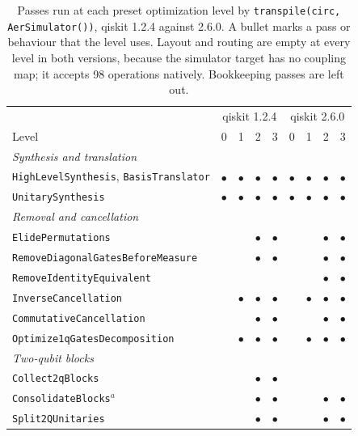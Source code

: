 \begin{table}[htbp]
\centering
\caption{Passes run at each preset optimization level by
\texttt{transpile(circ, AerSimulator())}, qiskit 1.2.4 against 2.6.0. A
bullet marks a pass or behaviour that the level uses. Layout and routing are
empty at every level in both versions, because the simulator target has no
coupling map; it accepts 98 operations natively. Bookkeeping passes are left
out.}
\label{tab:qiskit-optlevel-passes}
\footnotesize
\begin{tabular}{l|cccc|cccc}
\hline
 & \multicolumn{4}{c|}{qiskit 1.2.4} & \multicolumn{4}{c}{qiskit 2.6.0} \\
Level & 0 & 1 & 2 & 3 & 0 & 1 & 2 & 3 \\
\hline
\multicolumn{9}{l}{\textit{Synthesis and translation}} \\
\texttt{HighLevelSynthesis}, \texttt{BasisTranslator}
  & $\bullet$ & $\bullet$ & $\bullet$ & $\bullet$
  & $\bullet$ & $\bullet$ & $\bullet$ & $\bullet$ \\
\texttt{UnitarySynthesis}
  & $\bullet$ & $\bullet$ & $\bullet$ & $\bullet$
  & $\bullet$ & $\bullet$ & $\bullet$ & $\bullet$ \\
\hline
\multicolumn{9}{l}{\textit{Removal and cancellation}} \\
\texttt{ElidePermutations}
  & & & $\bullet$ & $\bullet$ & & & $\bullet$ & $\bullet$ \\
\texttt{RemoveDiagonalGatesBeforeMeasure}
  & & & $\bullet$ & $\bullet$ & & & $\bullet$ & $\bullet$ \\
\texttt{RemoveIdentityEquivalent}
  & & & & & & & $\bullet$ & $\bullet$ \\
\texttt{InverseCancellation}
  & & $\bullet$ & $\bullet$ & $\bullet$ & & $\bullet$ & $\bullet$ & $\bullet$ \\
\texttt{CommutativeCancellation}
  & & & $\bullet$ & $\bullet$ & & & $\bullet$ & $\bullet$ \\
\texttt{Optimize1qGatesDecomposition}
  & & $\bullet$ & $\bullet$ & $\bullet$ & & $\bullet$ & $\bullet$ & $\bullet$ \\
\hline
\multicolumn{9}{l}{\textit{Two-qubit blocks}} \\
\texttt{Collect2qBlocks}
  & & & $\bullet$ & $\bullet$ & & & & \\
\texttt{ConsolidateBlocks}$^{a}$
  & & & $\bullet$ & $\bullet$ & & & $\bullet$ & $\bullet$ \\
\texttt{Split2QUnitaries}
  & & & $\bullet$ & $\bullet$ & & & $\bullet$ & $\bullet$ \\

\end{tabular}
\end{table}
